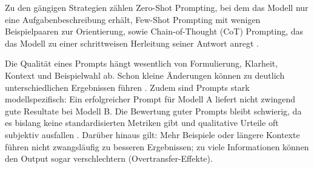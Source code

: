 Zu den gängigen Strategien zählen Zero-Shot Prompting, bei dem das Modell nur eine Aufgabenbeschreibung erhält, Few-Shot Prompting mit wenigen Beispielpaaren zur Orientierung, sowie Chain-of-Thought (CoT) Prompting, das das Modell zu einer schrittweisen Herleitung seiner Antwort anregt \cite{Schulhoff2024}.

Die Qualität eines Prompts hängt wesentlich von Formulierung, Klarheit, Kontext und Beispielwahl ab. Schon kleine Änderungen können zu deutlich unterschiedlichen Ergebnissen führen \cite{Schulhoff2024}. Zudem sind Prompts stark modellspezifisch: Ein erfolgreicher Prompt für Modell A liefert nicht zwingend gute Resultate bei Modell B. Die Bewertung guter Prompts bleibt schwierig, da es bislang keine standardisierten Metriken gibt und qualitative Urteile oft subjektiv ausfallen \cite{Sahoo2024}. Darüber hinaus gilt: Mehr Beispiele oder längere Kontexte führen nicht zwangsläufig zu besseren Ergebnissen; zu viele Informationen können den Output sogar verschlechtern (Overtransfer-Effekte). \cite{Liu2023}

